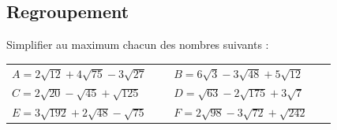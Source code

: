 \documentclass[oneside,12pt]{article}          %
\begin{document}
\subsection{Regroupement}
Simplifier au maximum chacun des nombres suivants :

\renewcommand{\arraystretch}{1.5}
\begin{tabular}{p{0.45\linewidth} p{0.45\linewidth}}
    $A=2\sqrt{12}+4\sqrt{75}-3\sqrt{27}$ & $B=6\sqrt{3}-3\sqrt{48}+5\sqrt{12}$ \\
    $C=2\sqrt{20}-\sqrt{45}+\sqrt{125}$ & $D=\sqrt{63}-2\sqrt{175}+3\sqrt{7}$ \\
    $E=3\sqrt{192}+2\sqrt{48}-\sqrt{75}$ & $F=2\sqrt{98}-3\sqrt{72}+\sqrt{242}$
\end{tabular}
\end{document}
